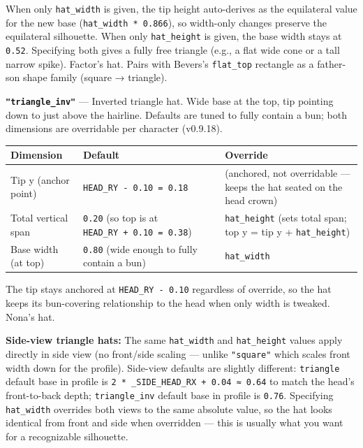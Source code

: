 \documentclass[
  12pt,
  letterpaper,
]{book}
\begin{document}
When only \texttt{hat\_width} is given, the tip height auto-derives as
the equilateral value for the new base (\texttt{hat\_width\ *\ 0.866}),
so width-only changes preserve the equilateral silhouette. When only
\texttt{hat\_height} is given, the base width stays at \texttt{0.52}.
Specifying both gives a fully free triangle (e.g., a flat wide cone or a
tall narrow spike). Factor's hat. Pairs with Bevers's \texttt{flat\_top}
rectangle as a father-son shape family (square → triangle).

\textbf{\texttt{"triangle\_inv"}} --- Inverted triangle hat. Wide base
at the top, tip pointing down to just above the hairline. Defaults are
tuned to fully contain a bun; both dimensions are overridable per
character (v0.9.18).

\begin{longtable}[]{@{}
  >{\raggedright\arraybackslash}p{}
  >{\raggedright\arraybackslash}p{}
  >{\raggedright\arraybackslash}p{}@{}}
\toprule\noalign{}
Dimension & Default & Override \\
\midrule\noalign{}
\endhead
\bottomrule\noalign{}
\endlastfoot
Tip y (anchor point) & \texttt{HEAD\_RY\ -\ 0.10\ =\ 0.18} & (anchored,
not overridable --- keeps the hat seated on the head crown) \\
Total vertical span & \texttt{0.20} (so top is at
\texttt{HEAD\_RY\ +\ 0.10\ =\ 0.38}) &
\texttt{hat\_height} (sets total span; top y = tip y +
\texttt{hat\_height}) \\
Base width (at top) & \texttt{0.80} (wide enough to fully contain a
bun) & \texttt{hat\_width} \\
\end{longtable}

The tip stays anchored at \texttt{HEAD\_RY\ -\ 0.10} regardless of
override, so the hat keeps its bun-covering relationship to the head
when only width is tweaked. Nona's hat.

\textbf{Side-view triangle hats:} The same \texttt{hat\_width} and
\texttt{hat\_height} values apply directly in side view (no front/side
scaling --- unlike \texttt{"square"} which scales front width down for
the profile). Side-view defaults are slightly different:
\texttt{triangle} default base in profile is
\texttt{2\ *\ \_SIDE\_HEAD\_RX\ +\ 0.04\ ≈\ 0.64} to match the head's
front-to-back depth; \texttt{triangle\_inv} default base in profile is
\texttt{0.76}. Specifying \texttt{hat\_width} overrides both views to
the same absolute value, so the hat looks identical from front and
side when overridden --- this is usually what you want for a
recognizable silhouette.
\end{document}

